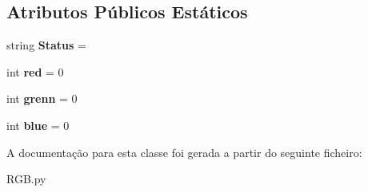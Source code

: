 \subsection*{Atributos Públicos Estáticos}
\begin{DoxyCompactItemize}
\item 
string {\bfseries Status} = \textquotesingle{}\textquotesingle{}\hypertarget{class_r_g_b_1_1_r_g_b_a5f42f2154a391307693daa76ab09371b}{}\label{class_r_g_b_1_1_r_g_b_a5f42f2154a391307693daa76ab09371b}

\item 
int {\bfseries red} = 0\hypertarget{class_r_g_b_1_1_r_g_b_a724e4202d3806663e894c59339aac1ff}{}\label{class_r_g_b_1_1_r_g_b_a724e4202d3806663e894c59339aac1ff}

\item 
int {\bfseries grenn} = 0\hypertarget{class_r_g_b_1_1_r_g_b_a50bb019bb34cde44f635fad512381835}{}\label{class_r_g_b_1_1_r_g_b_a50bb019bb34cde44f635fad512381835}

\item 
int {\bfseries blue} = 0\hypertarget{class_r_g_b_1_1_r_g_b_a7b2b6207ac7eebe82fdc048d567cab9f}{}\label{class_r_g_b_1_1_r_g_b_a7b2b6207ac7eebe82fdc048d567cab9f}

\end{DoxyCompactItemize}


A documentação para esta classe foi gerada a partir do seguinte ficheiro\+:\begin{DoxyCompactItemize}
\item 
R\+G\+B.\+py\end{DoxyCompactItemize}
